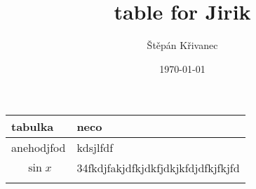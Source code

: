 \documentclass[11pt]{article}
\author{Štěpán Křivanec}
\date{\today}
\title{table for Jirik}
\begin{document}
\maketitle
\tableofcontents

\begin{center}
\begin{tabular}{ll}
tabulka & neco\\
\hline
anehodjfod & kdsjlfdf\\
$$\sin x$$ & 34fkdjfakjdfkjdkfjdkjkfdjdfkjfkjfd\\
 & \\
\end{tabular}
\end{center}
\end{document}
